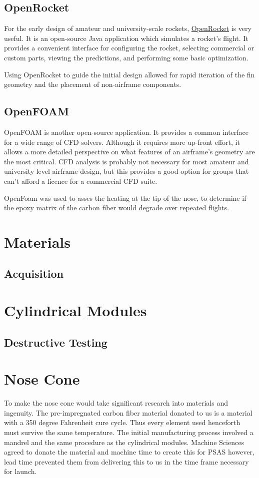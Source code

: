 \documentclass{aiaa-tc}%
\begin{document}
\subsection{OpenRocket}
For the early design of amateur and university-scale rockets, \href{http://openrocket.sourceforge.net/}{OpenRocket} is very useful. 
It is an open-source Java application which simulates a rocket's flight. It provides a convenient interface for configuring the rocket, selecting commercial or custom parts, viewing the predictions, and performing some basic optimization. 

Using OpenRocket to guide the initial design allowed for rapid iteration of the fin geometry and the placement of non-airframe components. 

\subsection{OpenFOAM}
OpenFOAM is another open-source application. It provides a common interface for a wide range of CFD solvers.
Although it requires more up-front effort, it allows a more detailed perspective on what features of an airframe's geometry are the most critical. 
CFD analysis is probably not necessary for most amateur and university level airframe design, but this provides a good option for groups that can't afford a licence for a commercial CFD suite. 

OpenFoam was used to asses the heating at the tip of the nose, to determine if the epoxy matrix of the carbon fiber would degrade over repeated flights.


\section{Materials}

\subsection{Acquisition}

\section{Cylindrical Modules}

\subsection{Destructive Testing}

\section{Nose Cone}\label{sec:noseCone}
To make the nose cone would take significant research into materials and ingenuity. The pre-impregnated carbon fiber material donated to us is a material with a 350 degree Fahrenheit cure cycle. Thus every element used henceforth must survive the same temperature. The initial manufacturing process involved a mandrel and the same procedure as the cylindrical modules. Machine Sciences agreed to donate the material and machine time to create this for PSAS however, lead time prevented them from delivering this to us in the time frame necessary for launch. 
\end{document}
